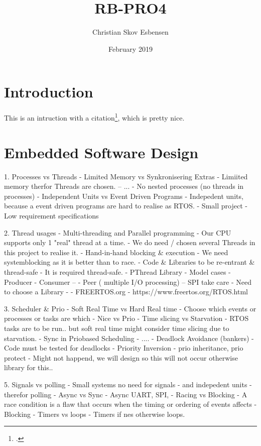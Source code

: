 \documentclass[11pt]{article}
\title{RB-PRO4}
\author{Christian Skov Esbensen}
\date{February 2019}
\begin{document}

\maketitle

\newpage
\tableofcontents

\newpage
{}

\section{Introduction}
This is an intruction with a citation\footcite[]{book}, which is pretty nice.

\section{Embedded Software Design}
1. Processes vs Threads
- Limited Memory vs Synkronisering Extras
    - Limiited memory therfor Threads are chosen. -- ...
    - No nested processes (no threads in processes)
- Independent Units vs Event Driven Programs
    - Indepedent units, because a event driven programs are hard to realise as RTOS.
    - Small project
    - Low requirement specifications

2. Thread usages
- Multi-threading and Parallel programming
    - Our CPU supports only 1 "real" thread at a time.
    - We do need / chosen several Threads in this project to realise it.
- Hand-in-hand blocking \& execution
    - We need systemblocking as it is better than to race.
- Code \& Libraries to be re-entrant \& thread-safe
    - It is required thread-safe.
- PThread Library
  - Model cases
    - Producer - Consumer --
    - Peer ( multiple I/O processing) -- SPI take care
    - Need to choose a Library -
    - FREERTOS.org - https://www.freertos.org/RTOS.html

3. Scheduler \& Prio
- Soft Real Time vs Hard Real time
    - Choose which events or processes or tasks are which
    - Nice vs Prio
- Time slicing vs Starvation
    - RTOS tasks are to be run.. but soft real time might consider time slicing due to starvation.
- Sync in Priobased Scheduling
    - ....
- Deadlock Avoidance (bankers)
    - Code must be tested for deadlocks
- Priority Inversion - prio inheritance, prio protect
    - Might not happend, we will design so this will not occur otherwise library for this..

5. Signals vs polling
    - Small systems no need for signals - and indepedent units - therefor polling
- Async vs Sync
    - Async UART, SPI,
- Racing vs Blocking - A race condition is a flaw that occurs when the timing or ordering of events affects
    - Blocking
- Timers vs loops
    - Timers if nes otherwise loops.
\end{document}

